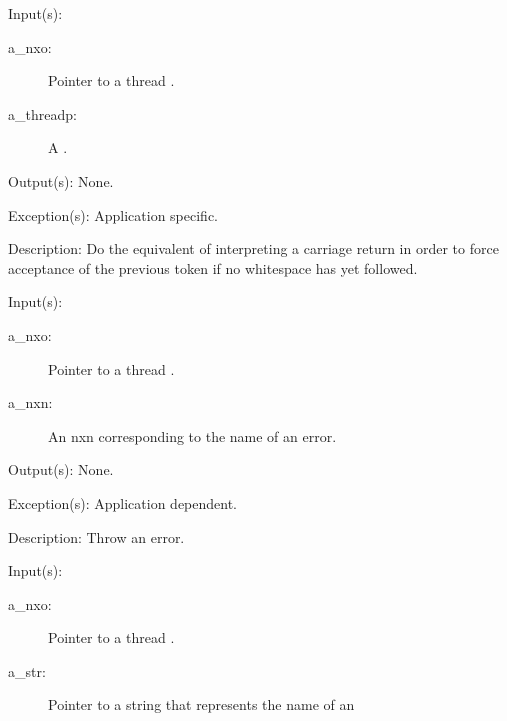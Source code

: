 \begin{capi}
\label{nxo_thread_flush}
	\begin{capilist}
	\item[Input(s): ]
		\begin{description}\item[]
		\item[a\_nxo: ]
			Pointer to a thread .
		\item[a\_threadp: ]
			A .
		\end{description}
	\item[Output(s): ] None.
	\item[Exception(s): ] Application specific.
	\item[Description: ]
		Do the equivalent of interpreting a carriage return in order to
		force acceptance of the previous token if no whitespace has yet
		followed.
	\end{capilist}
\label{nxo_thread_nerror}
	\begin{capilist}
	\item[Input(s): ]
		\begin{description}\item[]
		\item[a\_nxo: ]
			Pointer to a thread \classname{nxo}.
		\item[a\_nxn: ]
			An nxn corresponding to the name of an error.
		\end{description}
	\item[Output(s): ] None.
	\item[Exception(s): ] Application dependent.
	\item[Description: ]
		Throw an error.
	\end{capilist}
\label{nxo_thread_serror}
	\begin{capilist}
	\item[Input(s): ]
		\begin{description}\item[]
		\item[a\_nxo: ]
			Pointer to a thread .
		\item[a\_str: ]
			Pointer to a string that represents the name of an

\end{description}
\end{capilist}
\end{capi}
